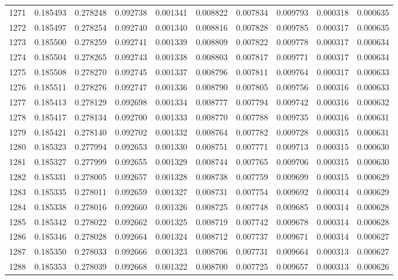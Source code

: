 \begin{tabular}{lrrrrrrrrr}
1271 & 0.185493 & 0.278248 & 0.092738 & 0.001341 & 0.008822 & 0.007834 & 0.009793 & 0.000318 & 0.000635 \\
1272 & 0.185497 & 0.278254 & 0.092740 & 0.001340 & 0.008816 & 0.007828 & 0.009785 & 0.000317 & 0.000635 \\
1273 & 0.185500 & 0.278259 & 0.092741 & 0.001339 & 0.008809 & 0.007822 & 0.009778 & 0.000317 & 0.000634 \\
1274 & 0.185504 & 0.278265 & 0.092743 & 0.001338 & 0.008803 & 0.007817 & 0.009771 & 0.000317 & 0.000634 \\
1275 & 0.185508 & 0.278270 & 0.092745 & 0.001337 & 0.008796 & 0.007811 & 0.009764 & 0.000317 & 0.000633 \\
1276 & 0.185511 & 0.278276 & 0.092747 & 0.001336 & 0.008790 & 0.007805 & 0.009756 & 0.000316 & 0.000633 \\
1277 & 0.185413 & 0.278129 & 0.092698 & 0.001334 & 0.008777 & 0.007794 & 0.009742 & 0.000316 & 0.000632 \\
1278 & 0.185417 & 0.278134 & 0.092700 & 0.001333 & 0.008770 & 0.007788 & 0.009735 & 0.000316 & 0.000631 \\
1279 & 0.185421 & 0.278140 & 0.092702 & 0.001332 & 0.008764 & 0.007782 & 0.009728 & 0.000315 & 0.000631 \\
1280 & 0.185323 & 0.277994 & 0.092653 & 0.001330 & 0.008751 & 0.007771 & 0.009713 & 0.000315 & 0.000630 \\
1281 & 0.185327 & 0.277999 & 0.092655 & 0.001329 & 0.008744 & 0.007765 & 0.009706 & 0.000315 & 0.000630 \\
1282 & 0.185331 & 0.278005 & 0.092657 & 0.001328 & 0.008738 & 0.007759 & 0.009699 & 0.000315 & 0.000629 \\
1283 & 0.185335 & 0.278011 & 0.092659 & 0.001327 & 0.008731 & 0.007754 & 0.009692 & 0.000314 & 0.000629 \\
1284 & 0.185338 & 0.278016 & 0.092660 & 0.001326 & 0.008725 & 0.007748 & 0.009685 & 0.000314 & 0.000628 \\
1285 & 0.185342 & 0.278022 & 0.092662 & 0.001325 & 0.008719 & 0.007742 & 0.009678 & 0.000314 & 0.000628 \\
1286 & 0.185346 & 0.278028 & 0.092664 & 0.001324 & 0.008712 & 0.007737 & 0.009671 & 0.000314 & 0.000627 \\
1287 & 0.185350 & 0.278033 & 0.092666 & 0.001323 & 0.008706 & 0.007731 & 0.009664 & 0.000313 & 0.000627 \\
1288 & 0.185353 & 0.278039 & 0.092668 & 0.001322 & 0.008700 & 0.007725 & 0.009657 & 0.000313 & 0.000626 \\

\end{tabular}
